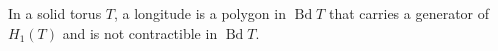 In a solid torus $T$, a longitude is a polygon in $\operatorname{Bd} T$ that carries a generator of $H_1(T)$ and is not contractible in $\operatorname{Bd} T$.
